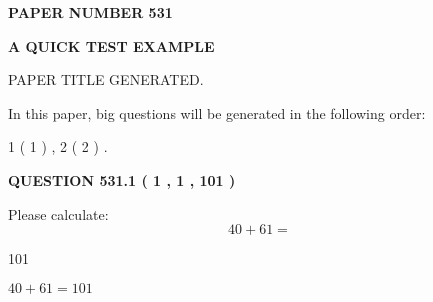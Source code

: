 \documentclass[12pt]{article}
\begin{document}
   
   
   
\newpage 
\setcounter{page}{ 
   531001 } 
   
   
   
   
 {\textbf{ \Large{ PAPER NUMBER  531  }}}
   
   
\vspace{0.2in}
   
   
   
   
   
   
   
   
 \vspace{0.2in}
{\LARGE {\textbf{ A QUICK TEST EXAMPLE}}}
   
   
 PAPER TITLE GENERATED.
   
   
   
\vspace{0.2in}
   
In this paper, big questions will be generated in the following order: 
   
   
   1 ( 1 )
 ,
   2 ( 2 )
 .
  
\vspace{0.2in}
  
{\textbf{\Large{QUESTION
531.1 
 ( 1 , 1 , 101 )
}}}
  
  
 
Please calculate:
\begin{equation}
40 +  %
61 = \nonumber
\end{equation}
 
 
 
\noindent{}
 
 

101
 
 
\noindent{}
 
 

 
 
 
\noindent{}
 
 

$ %
40 +  %
61=   %
101$
 
 
\noindent{}
 
 

 
   
\end{document}
